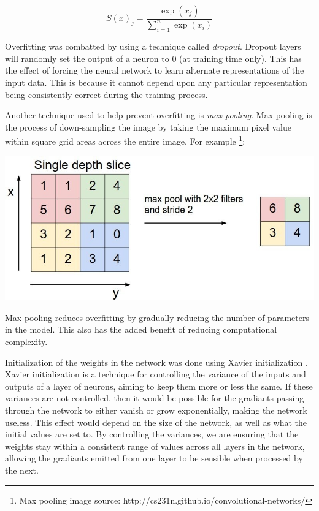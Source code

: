 \documentclass[12pt]{article}
\begin{document}
\begin{equation}
	S(x)_j = \frac{\exp(x_j)}{\sum_{i=1}^{n} \exp(x_i)}
\end{equation}

Overfitting was combatted by using a technique called \textit{dropout}\cite{svhn_dropout}.
Dropout layers will randomly set the output of a neuron to 0 (at training time only).
This has the effect of forcing the neural network to learn alternate representations of the input data.
This is because it cannot depend upon any particular representation being consistently correct during the training process.

Another technique used to help prevent overfitting is \textit{max pooling}.
Max pooling is the process of down-sampling the image by taking the maximum pixel value within square grid areas across the entire image.
For example \footnote{Max pooling image source: http://cs231n.github.io/convolutional-networks/}:

\hfill \break
\begin{centering}
	\includegraphics[width=0.85\columnwidth]{images/maxpool.jpg}
	\label{Testing}
\end{centering}
\hfill \break

Max pooling reduces overfitting by gradually reducing the number of parameters in the model.
This also has the added benefit of reducing computational complexity. 

Initialization of the weights in the network was done using Xavier initialization \cite{xavier}.
Xavier initialization is a technique for controlling the variance of the inputs and outputs of a layer of neurons, aiming to keep them more or less the same.
If these variances are not controlled, then it would be possible for the gradiants passing through the network to either vanish or grow exponentially, making the network useless. 
This effect would depend on the size of the network, as well as what the initial values are set to.
By controlling the variances, we are ensuring that the weights stay within a consistent range of values across all layers in the network, allowing the gradiants emitted from one layer to be sensible when processed by the next.
\end{document}
